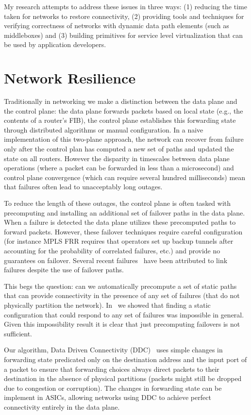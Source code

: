 \documentclass[letterpaper]{article}
\begin{document}
My research attempts to address these issues in three ways: (1) reducing the time taken for networks to restore
connectivity, (2) providing tools and techniques for verifying correctness of networks with dynamic data path elements
(such as middleboxes) and (3) building primitives for service level virtualization that can be used by application
developers.

\section*{Network Resilience}
Traditionally in networking we make a distinction between the data plane and the control plane: the data plane forwards
packets based on local state (e.g., the contents of a router's FIB), the control plane establishes this forwarding state
through distributed algorithms or manual configuration. In a naive implementation of this two-plane approach, the
network can recover from failure only after the control plan has computed a new set of paths and updated the state on
all routers. However the disparity in timescales between data plane operations (where a packet can be forwarded in less
than a microsecond) and control plane convergence (which can require several hundred milliseconds) mean that failures
often lead to unacceptably long outages.

To reduce the length of these outages, the control plane is often tasked with precomputing and installing an additional
set of failover paths in the data plane. When a failure is detected the data plane utilizes these precomputed paths to
forward packets. However, these failover techniques require careful configuration (for instance MPLS FRR requires that
operators set up backup tunnels after accounting for the probability of correlated failures, etc.) and provide no
guarantees on failover. Several recent failures~\cite{sprint2006, emea2008, wiki2012} have been attributed to link
failures despite the use of failover paths. 

This begs the question: can we automatically precompute a set of static paths that can provide connectivity in the
presence of any set of failures (that do not physically partition the network). In~\cite{feigenbaum12resilience} we
showed that finding a static configuration that could respond to any set of failures was impossible in general. Given
this impossibility result it is clear that just precomputing failovers is not sufficient.

Our algorithm, Data Driven Connectivity (DDC)~\cite{liu13ddc} uses simple changes in forwarding state predicated
only on the destination address and the input port of a packet to ensure that forwarding choices always direct packets
to their destination in the absence of physical partitions (packets might still be dropped due to congestion or
corruption). The changes in forwarding state can be implement in ASICs, allowing networks using DDC to achieve perfect
connectivity entirely in the data plane.
\end{document}
